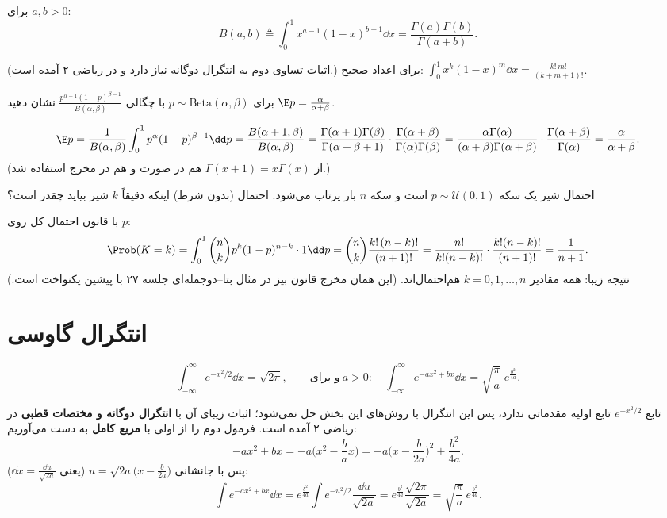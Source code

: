 \begin{definition}
برای $a,b>0$:
\[
B(a,b)\triangleq\int_0^1x^{a-1}(1-x)^{b-1}\dd x=\frac{\Gamma(a)\Gamma(b)}{\Gamma(a+b)} .
\]
\end{definition}
(اثبات تساوی دوم به انتگرال دوگانه نیاز دارد و در ریاضی ۲ آمده است.) برای اعداد صحیح: $\int_0^1x^k(1-x)^{m}\dd x=\frac{k!\,m!}{(k+m+1)!}$.

\begin{example}
برای $p\sim\mathrm{Beta}(\alpha,\beta)$ با چگالی $\frac{p^{\alpha-1}(1-p)^{\beta-1}}{B(\alpha,\beta)}$ نشان دهید $\E p=\frac{\alpha}{\alpha+\beta}$.
\begin{solution}
\[
\E p=\frac{1}{B(\alpha,\beta)}\int_0^1p^{\alpha}(1-p)^{\beta-1}\dd p=\frac{B(\alpha+1,\beta)}{B(\alpha,\beta)}=\frac{\Gamma(\alpha+1)\Gamma(\beta)}{\Gamma(\alpha+\beta+1)}\cdot\frac{\Gamma(\alpha+\beta)}{\Gamma(\alpha)\Gamma(\beta)}=\frac{\alpha\Gamma(\alpha)}{(\alpha+\beta)\Gamma(\alpha+\beta)}\cdot\frac{\Gamma(\alpha+\beta)}{\Gamma(\alpha)}=\frac{\alpha}{\alpha+\beta}.
\]
(از $\Gamma(x+1)=x\Gamma(x)$ هم در صورت و هم در مخرج استفاده شد.)
\end{solution}
\end{example}

\begin{example}
احتمال شیر یک سکه $p\sim\mathcal U(0,1)$ است و سکه $n$ بار پرتاب می‌شود. احتمال (بدون شرط) اینکه دقیقاً $k$ شیر بیاید چقدر است؟
\begin{solution}
با قانون احتمال کل روی $p$:
\[
\Prob(K=k)=\int_0^1\binom nkp^k(1-p)^{n-k}\cdot1\dd p=\binom nk\frac{k!\,(n-k)!}{(n+1)!}=\frac{n!}{k!(n-k)!}\cdot\frac{k!(n-k)!}{(n+1)!}=\frac{1}{n+1}.
\]
نتیجه زیبا: همه مقادیر $k=0,1,\ldots,n$ هم‌احتمال‌اند. (این همان مخرج قانون بیز در مثال بتا--دوجمله‌ای جلسه ۲۷ با پیشین یکنواخت است.)
\end{solution}
\end{example}

\section{انتگرال گاوسی}
\begin{theorem}
\[
\int_{-\infty}^{\infty}e^{-x^2/2}\dd x=\sqrt{2\pi},\qquad\text{و برای}\ a>0:\quad\int_{-\infty}^{\infty}e^{-ax^2+bx}\dd x=\sqrt{\frac\pi a}\;e^{\frac{b^2}{4a}} .
\]
\end{theorem}
تابع $e^{-x^2/2}$ تابع اولیه مقدماتی ندارد، پس این انتگرال با روش‌های این بخش حل نمی‌شود؛ اثبات زیبای آن با \textbf{انتگرال دوگانه و مختصات قطبی} در ریاضی ۲ آمده است. فرمول دوم را از اولی با \textbf{مربع کامل} به دست می‌آوریم:
\[
-ax^2+bx=-a\Big(x^2-\frac bax\Big)=-a\Big(x-\frac{b}{2a}\Big)^2+\frac{b^2}{4a}.
\]
پس با جانشانی $u=\sqrt{2a}\big(x-\frac{b}{2a}\big)$ (یعنی $\dd x=\frac{\dd u}{\sqrt{2a}}$):
\[
\int e^{-ax^2+bx}\dd x=e^{\frac{b^2}{4a}}\int e^{-u^2/2}\frac{\dd u}{\sqrt{2a}}=e^{\frac{b^2}{4a}}\frac{\sqrt{2\pi}}{\sqrt{2a}}=\sqrt{\frac\pi a}\,e^{\frac{b^2}{4a}} .
\]

